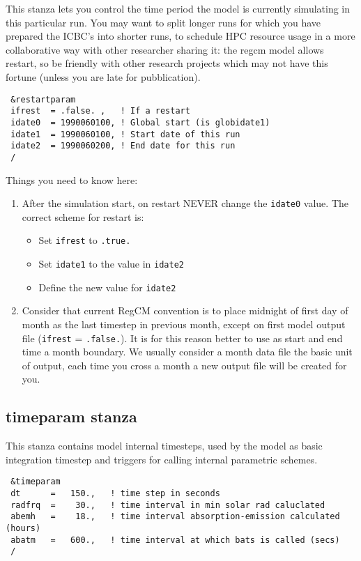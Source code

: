 This stanza lets you control the time period the model is currently simulating
in this particular run. You may want to split longer runs for which you have
prepared the ICBC's into shorter runs, to schedule HPC resource usage in a more
collaborative way with other researcher sharing it: the regcm model allows
restart, so be friendly with other research projects which may not have this
fortune (unless you are late for pubblication).

{\footnotesize
\begin{Verbatim}
 &restartparam
 ifrest  = .false. ,   ! If a restart
 idate0  = 1990060100, ! Global start (is globidate1)
 idate1  = 1990060100, ! Start date of this run
 idate2  = 1990060200, ! End date for this run
 /
\end{Verbatim}
}

Things you need to know here:

\begin{enumerate}
\item After the simulation start, on restart NEVER change the \verb=idate0=
value. The correct scheme for restart is:
\begin{itemize}
\item Set \verb=ifrest= to \verb=.true.=
\item Set \verb=idate1= to the value in \verb=idate2=
\item Define the new value for \verb=idate2=
\end{itemize}
\item Consider that current RegCM convention is to place midnight of first
day of month as the last timestep in previous month, except on first model
output file (\verb=ifrest= = \verb=.false.=). It is for this reason better
to use as start and end time a month boundary. We usually consider a month
data file the basic unit of output, each time you cross a month a new output
file will be created for you.
\end{enumerate}

\subsection{timeparam stanza}

This stanza contains model internal timesteps, used by the model as basic
integration timestep and triggers for calling internal parametric schemes.

{\footnotesize
\begin{Verbatim}
 &timeparam
 dt      =   150.,   ! time step in seconds
 radfrq  =    30.,   ! time interval in min solar rad caluclated
 abemh   =    18.,   ! time interval absorption-emission calculated (hours)
 abatm   =   600.,   ! time interval at which bats is called (secs)
 /
\end{Verbatim}
}

